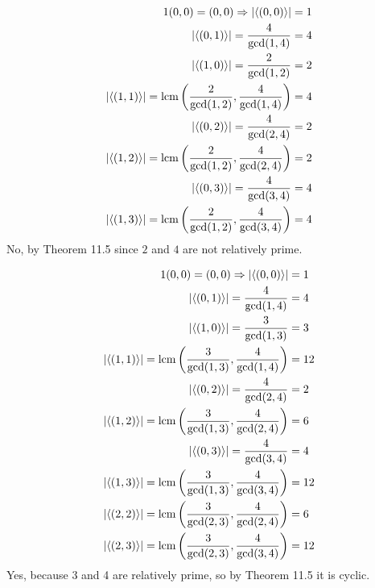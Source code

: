\documentclass[12pt]{article}
\begin{document}
\begin{problem}[11.1]
\begin{align*}
	1(0,0)=(0,0) \Rightarrow |\langle (0,0) \rangle|&=1\\
	|\langle (0,1) \rangle|=\frac{4}{ \gcd ( 1,4) } &= 4\\
	|\langle (1,0) \rangle| = \frac{2}{ \gcd ( 1,2) } &= 2\\
	|\langle (1,1) \rangle|= \operatorname{lcm} \left( \frac{2}{ \gcd ( 1,2) },  \frac{4}{ \gcd ( 1,4) } \right)  &=4\\
	|\langle (0,2) \rangle| =\frac{4}{ \gcd ( 2,4) } &=2\\
	|\langle (1,2) \rangle| = \operatorname{lcm} \left( \frac{2}{ \gcd ( 1,2) }, \frac{4}{ \gcd ( 2,4) } \right)   &= 2\\
	|\langle (0,3) \rangle|=\frac{4}{ \gcd ( 3,4) } &=4\\
	|\langle (1,3) \rangle|= \operatorname{lcm} \left( \frac{2}{ \gcd ( 1,2) }, \frac{4}{ \gcd ( 3,4) } \right)   &=4 
\end{align*}
No, by Theorem 11.5 since $ 2$ and  $ 4$ are not relatively prime.

\end{problem}
\begin{problem}[11.2]
\begin{align*}
	1(0,0)=(0,0) \Rightarrow |\langle (0,0) \rangle|&=1\\
	|\langle (0,1) \rangle|=\frac{4}{ \gcd ( 1,4) } &= 4\\
	|\langle (1,0) \rangle| = \frac{3}{ \gcd ( 1,3) } &= 3\\
	|\langle (1,1) \rangle|= \operatorname{lcm} \left( \frac{3}{ \gcd ( 1,3) },  \frac{4}{ \gcd ( 1,4) } \right)  &=12\\
	|\langle (0,2) \rangle| =\frac{4}{ \gcd ( 2,4) } &=2\\
	|\langle (1,2) \rangle| = \operatorname{lcm} \left( \frac{3}{ \gcd ( 1,3) }, \frac{4}{ \gcd ( 2,4) } \right)   &= 6\\
	|\langle (0,3) \rangle|=\frac{4}{ \gcd ( 3,4) } &=4\\
	|\langle (1,3) \rangle|= \operatorname{lcm} \left( \frac{3}{ \gcd ( 1,3) }, \frac{4}{ \gcd ( 3,4) } \right)   &=12\\
	|\langle (2,2) \rangle| = \operatorname{lcm} \left( \frac{3}{ \gcd ( 2,3) }, \frac{4}{ \gcd ( 2,4) } \right)  &= 6 \\
	|\langle (2,3) \rangle| = \operatorname{lcm} \left( \frac{3}{ \gcd ( 2,3) }, \frac{4}{ \gcd ( 3,4) } \right) &= 12  
\end{align*}
Yes, because 3 and 4 are relatively prime, so by Theorem 11.5 it is cyclic.
\end{problem}
\end{document}
